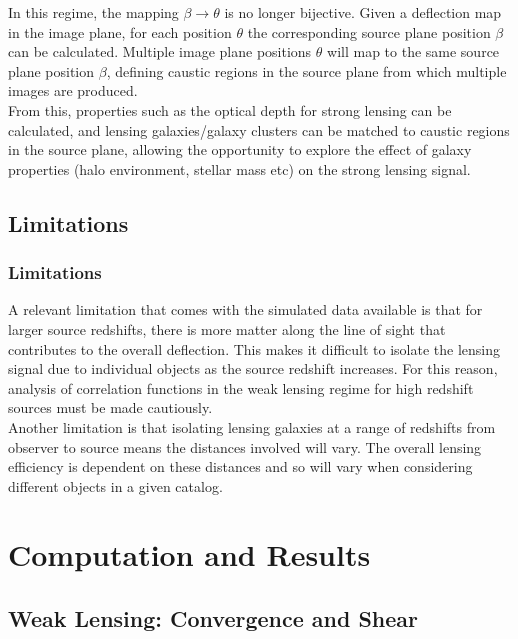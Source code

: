\documentclass{beamer}
\begin{document}
  \begin{frame}
    In this regime, the mapping $\beta \rightarrow \theta$ is no longer bijective. Given a deflection map in the image plane, for each position $\theta$ the corresponding source plane position $\beta$ can be calculated. Multiple image plane positions $\theta$ will map to the same source plane position $\beta$, defining caustic regions in the source plane from which multiple images are produced.
    \\
    From this, properties such as the optical depth for strong lensing can be calculated, and lensing galaxies/galaxy clusters can be matched to caustic regions in the source plane, allowing the opportunity to explore the effect of galaxy properties (halo environment, stellar mass etc) on the strong lensing signal.
  \end{frame}

  \subsection{Limitations}

  \begin{frame}
    \frametitle{\sc Limitations}
    A relevant limitation that comes with the simulated data available is that for larger source redshifts, there is more matter along the line of sight that contributes to the overall deflection. This makes it difficult to isolate the lensing signal due to individual objects as the source redshift increases. For this reason, analysis of correlation functions in the weak lensing regime for high redshift sources must be made cautiously.
    \\
    Another limitation is that isolating lensing galaxies at a range of redshifts from observer to source means the distances involved will vary. The overall lensing efficiency is dependent on these distances and so will vary when considering different objects in a given catalog.
  \end{frame}



  \section{Computation and Results}

  \subsection{Weak Lensing: Convergence and Shear}
\end{document}
